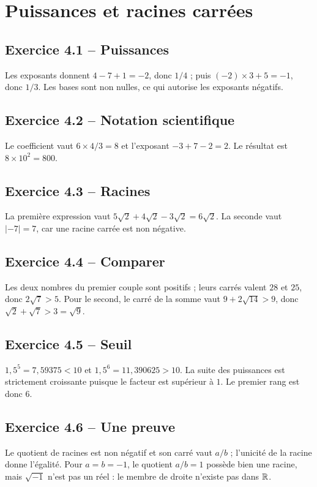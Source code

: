 \chapter{Puissances et racines carrées}
\section*{Exercice 4.1 -- Puissances}
Les exposants donnent $4-7+1=-2$, donc $1/4$ ; puis $(-2)\times3+5=-1$, donc $1/3$. Les bases sont non nulles, ce qui autorise les exposants négatifs.

\section*{Exercice 4.2 -- Notation scientifique}
Le coefficient vaut $6\times4/3=8$ et l'exposant $-3+7-2=2$. Le résultat est $8\times10^2=800$.

\section*{Exercice 4.3 -- Racines}
La première expression vaut $5\sqrt2+4\sqrt2-3\sqrt2=6\sqrt2$. La seconde vaut $|-7|=7$, car une racine carrée est non négative.

\section*{Exercice 4.4 -- Comparer}
Les deux nombres du premier couple sont positifs ; leurs carrés valent $28$ et $25$, donc $2\sqrt7>5$. Pour le second, le carré de la somme vaut $9+2\sqrt{14}>9$, donc $\sqrt2+\sqrt7>3=\sqrt9$.

\section*{Exercice 4.5 -- Seuil}
$1{,}5^5=7{,}59375<10$ et $1{,}5^6=11{,}390625>10$. La suite des puissances est strictement croissante puisque le facteur est supérieur à $1$. Le premier rang est donc $6$.

\section*{Exercice 4.6 -- Une preuve}
Le quotient de racines est non négatif et son carré vaut $a/b$ ; l'unicité de la racine donne l'égalité. Pour $a=b=-1$, le quotient $a/b=1$ possède bien une racine, mais $\sqrt{-1}$ n'est pas un réel : le membre de droite n'existe pas dans $\mathbb{R}$.

